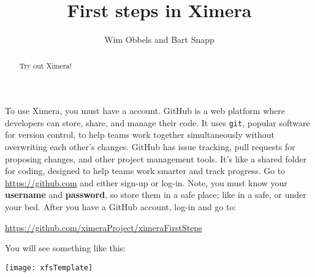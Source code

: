 \documentclass{ximera}
\author{Wim Obbels and Bart Snapp}
\title{First steps in Ximera}
\begin{document}
        \begin{abstract}
            Try out Ximera!
        \end{abstract}
        \maketitle

        To use Ximera, you must have a 
        account.
        GitHub is a web platform where developers can store, share, and
        manage
        their code. It uses \verb!git!, popular software for version control,
        to help
        teams work together simultaneously
        without overwriting each other's changes. GitHub has	issue tracking,
        pull requests for proposing changes, and other project management
        tools. It's
        like a shared folder
        for coding, designed to help teams work smarter and track progress.
        Go to \url{https://github.com} and either sign-up or log-in. Note, you
        must
        know
        your \textbf{username} and \textbf{password}, so store them in a safe
        place; like in a safe, or under your bed. After you have a GitHub
        account, log-in and go to:
        \begin{center}
            \url{https://github.com/ximeraProject/ximeraFirstSteps}
        \end{center}

        You will see something like this:
        \pdfOnly{\end{multicols}}
\begin{image}
    \texttt{[image: xfsTemplate]}
\end{image}
\newpage
\end{document}
